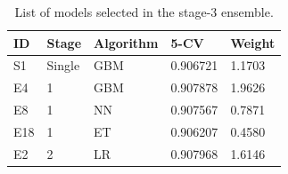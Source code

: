 \begin{table}
\begin{center}
	\caption{List of models selected in the stage-3 ensemble.}
\begin{tabular}{lllll}
ID 	& Stage 	& Algorithm 	& 5-CV 		& Weight\\ \hline
S1 	& Single	& GBM		& 0.906721 	& 1.1703 \\
E4 	& 1 		& GBM		& 0.907878 	& 1.9626\\
E8 	& 1 		& NN		& 0.907567	& 0.7871\\
E18	& 1		& ET			& 0.906207 	& 0.4580\\
E2	& 2 		& LR			& 0.907968 	& 1.6146\\
\end{tabular}

\label{tb:finalEnsemble}
\end{center}
\end{table}
